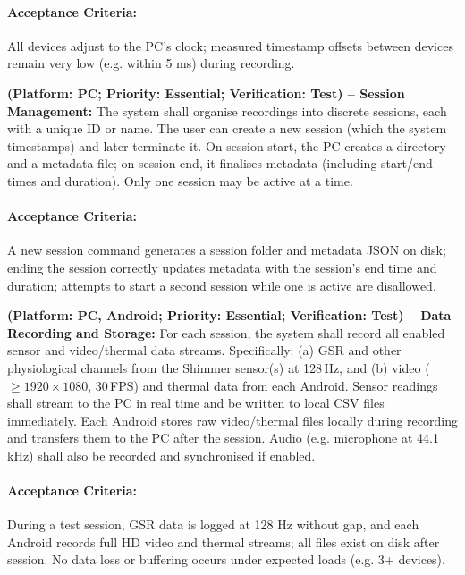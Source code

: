 \begin{description}[style=unboxed,leftmargin=0cm]
    \paragraph{Acceptance Criteria:} All devices adjust to the PC’s clock; measured timestamp offsets between devices remain very low (e.g. within 5 ms) during recording.

    \item[\textbf{FR4}] \textbf{(Platform: PC; Priority: Essential; Verification: Test) – Session Management:} The system shall organise recordings into discrete sessions, each with a unique ID or name. The user can create a new session (which the system timestamps) and later terminate it. On session start, the PC creates a directory and a metadata file; on session end, it finalises metadata (including start/end times and duration). Only one session may be active at a time.

    \paragraph{Acceptance Criteria:} A new session command generates a session folder and metadata JSON on disk; ending the session correctly updates metadata with the session’s end time and duration; attempts to start a second session while one is active are disallowed.

    \item[\textbf{FR5}] \textbf{(Platform: PC, Android; Priority: Essential; Verification: Test) – Data Recording and Storage:} For each session, the system shall record all enabled sensor and video/thermal data streams. Specifically: (a) GSR and other physiological channels from the Shimmer sensor(s) at 128\,Hz, and (b) video ($\geq 1920 \times 1080$, 30\,FPS) and thermal data from each Android. Sensor readings shall stream to the PC in real time and be written to local CSV files immediately. Each Android stores raw video/thermal files locally during recording and transfers them to the PC after the session. Audio (e.g. microphone at 44.1\,kHz) shall also be recorded and synchronised if enabled.

    \paragraph{Acceptance Criteria:} During a test session, GSR data is logged at 128 Hz without gap, and each Android records full HD video and thermal streams; all files exist on disk after session. No data loss or buffering occurs under expected loads (e.g. 3+ devices).


\end{description}

